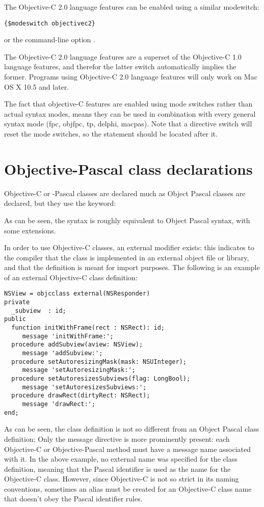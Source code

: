 The Objective-C 2.0 language features can be enabled using a similar
modewitch:
\begin{verbatim}
{$modeswitch objectivec2}
\end{verbatim}
or the command-line option .

The Objective-C 2.0 language features are a superset of the Objective-C 1.0
language features, and therefor the latter switch automatically implies the
former. Programs using Objective-C 2.0 language features will only work on
Mac OS X 10.5 and later.

The fact that objective-C features are enabled using mode switches rather than 
actual syntax modes, means they can be used in combination with every general 
syntax mode (fpc, objfpc, tp, delphi, macpas). Note that a 
directive switch will reset the mode switches, so the 
statement should be located after it.

\section{Objective-Pascal class declarations}
Objective-C or -Pascal classes are declared much as Object Pascal classes are
declared, but they use the  keyword:

As can be seen, the syntax is roughly equivalent to Object Pascal syntax, with some
extensions.

In order to use Objective-C classes, an external modifier exists: this
indicates to the compiler that the class is implemented in an external object
file or library, and that the definition is meant for import purposes.
The following is an example of an external Objective-C class definition:
\begin{verbatim}
NSView = objcclass external(NSResponder)
private
  _subview  : id; 
public
  function initWithFrame(rect : NSRect): id; 
     message 'initWithFrame:';
  procedure addSubview(aview: NSView); 
     message 'addSubview:';
  procedure setAutoresizingMask(mask: NSUInteger); 
     message 'setAutoresizingMask:';
  procedure setAutoresizesSubviews(flag: LongBool); 
     message 'setAutoresizesSubviews:';
  procedure drawRect(dirtyRect: NSRect); 
     message 'drawRect:';
end;
\end{verbatim}
As can be seen, the class definition is not so different from an Object
Pascal class definition; Only the message directive is more prominently
present: each Objective-C or Objective-Pascal method must have a message
name associated with it. In the above example, no external name was 
specified for the class definition, meaning that the Pascal identifier is
used as the name for the Objective-C class. However, since Objective-C is not so
strict in its naming conventions, sometimes an alias must be created for an
Objective-C class name that doesn't obey the Pascal identifier rules. 


